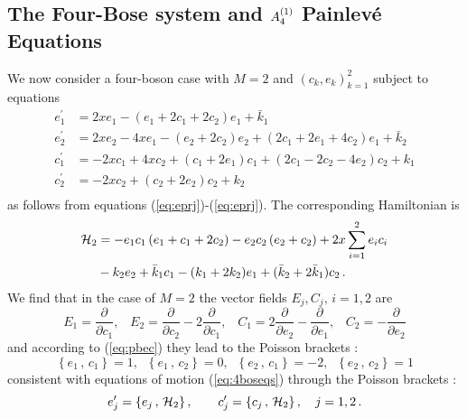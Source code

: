 \documentclass[12pt]{article}
\numberwithin{equation}{section}
\def\rf#1{(\ref{eq:#1})}
\def\lab#1{\label{eq:#1}}
\providecommand*{\pder}[3][]{%
\frac{\partial^{#1}#2}{\partial #3^{#1}}}
\begin{document}
\subsection{The Four-Bose system and $\boldmath{ A^{(1)}_4}$
Painlev\'e Equations}
\label{subsection:M=2}
We now consider a four-boson case with  $M=2$
and $(c_k,e_k)_{k=1}^{2}$ subject to equations
\begin{equation}
\begin{split}
e_1^\prime&=2xe_1-(e_1+2c_1+2c_2)e_1+{\bar k}_1\\
e_2^\prime&=2xe_2-4xe_1-(e_2+2c_2)e_2+(2c_1+2e_1+
4c_2)e_1+{\bar k}_2\\
c_1^\prime &= -2xc_1+4xc_2+(c_1+2e_1)c_1+
(2c_1-2c_2-4e_2)c_2+k_1\\
c_2^\prime&=-2xc_2+(c_2+2e_2)c_2+k_2\\
\end{split}
\lab{4boseqs}
\end{equation}
as follows from  equations \rf{eprj}-\rf{eprj}.
The corresponding Hamiltonian is
\begin{equation}
\begin{split}
{\cal H}_2&= - e_{1} c_{1} \left( e_{1}+ c_{1}+2 c_2 \right)
- e_{2} c_2  \left( e_{2}+  c_2 \right)
+2 x \sum_{i=1}^2 e_ic_i \\
&-k_2 e_2 +{\bar k}_1 c_1 -(k_1+2 k_2)e_1 +({\bar k}_2 +2 {\bar k}_1)
c_2\, .
\lab{4boseham}
\end{split}
\end{equation}
{}We find that in the case of $M=2$ the vector fields $E_j,C_j,\,i=1,2$
are
\[
E_1= \pder{}{c_1}, \;\;\; E_2=\pder{}{c_2} -2 \pder{}{c_1},
\;\;\;C_1= 2\pder{}{e_2} - \pder{}{e_1} , \;\;\;
C_2= -\pder{}{e_2} 
\]
and according to \rf{pbec} they lead to the Poisson brackets  :
\begin{equation}
\left\{ e_1\, , \, c_1 \right\} = 1 , \;\;
\left\{ e_1\, , \, c_2 \right\} = 0 , \;\;
\left\{ e_2\, , \, c_1 \right\} = -2 , \;\;
\left\{ e_2\, , \, c_2 \right\} = 1
\lab{M2pb}
\end{equation}
consistent with equations of motion \rf{4boseqs} through
the Poisson brackets :
\begin{equation}
e_j^\prime=
\left\{ e_j \, ,\, {\cal H}_2\right\}, \qquad
c_j^\prime = \left\{ c_j \, ,\, {\cal H}_2\right\} , \quad j=1,2\, .
\lab{4bosepb}
\end{equation}
\end{document}
